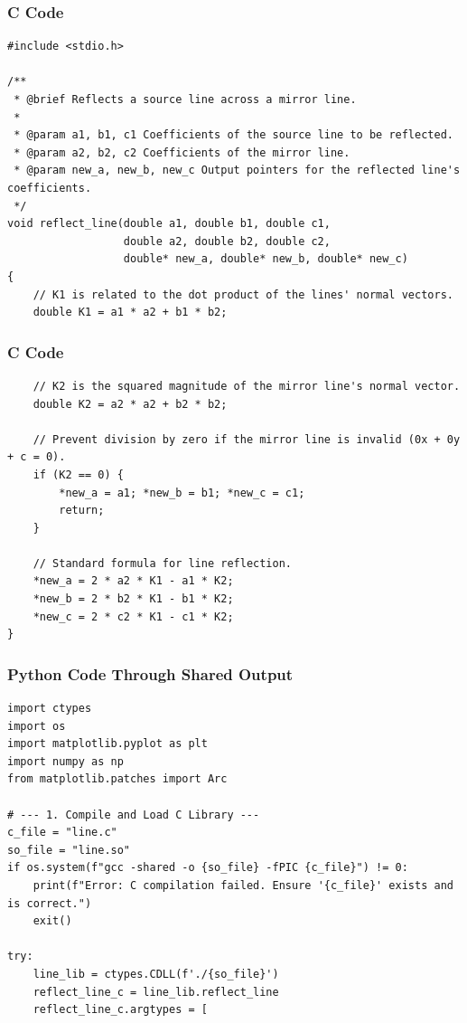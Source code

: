 \documentclass{beamer}
\begin{document}
\begin{frame}[fragile]
\frametitle{C Code}
\begin{lstlisting}
#include <stdio.h>

/**
 * @brief Reflects a source line across a mirror line.
 *
 * @param a1, b1, c1 Coefficients of the source line to be reflected.
 * @param a2, b2, c2 Coefficients of the mirror line.
 * @param new_a, new_b, new_c Output pointers for the reflected line's coefficients.
 */
void reflect_line(double a1, double b1, double c1,
                  double a2, double b2, double c2,
                  double* new_a, double* new_b, double* new_c)
{
    // K1 is related to the dot product of the lines' normal vectors.
    double K1 = a1 * a2 + b1 * b2;
\end{lstlisting}
\end{frame}
\begin{frame}[fragile]
\frametitle{C Code}
\begin{lstlisting}
    // K2 is the squared magnitude of the mirror line's normal vector.
    double K2 = a2 * a2 + b2 * b2;

    // Prevent division by zero if the mirror line is invalid (0x + 0y + c = 0).
    if (K2 == 0) {
        *new_a = a1; *new_b = b1; *new_c = c1;
        return;
    }
    
    // Standard formula for line reflection.
    *new_a = 2 * a2 * K1 - a1 * K2;
    *new_b = 2 * b2 * K1 - b1 * K2;
    *new_c = 2 * c2 * K1 - c1 * K2;
}
\end{lstlisting}
\end{frame}
\begin{frame}[fragile]
\frametitle{Python Code Through Shared Output}
\begin{lstlisting}
import ctypes
import os
import matplotlib.pyplot as plt
import numpy as np
from matplotlib.patches import Arc

# --- 1. Compile and Load C Library ---
c_file = "line.c"
so_file = "line.so"
if os.system(f"gcc -shared -o {so_file} -fPIC {c_file}") != 0:
    print(f"Error: C compilation failed. Ensure '{c_file}' exists and is correct.")
    exit()

try:
    line_lib = ctypes.CDLL(f'./{so_file}')
    reflect_line_c = line_lib.reflect_line
    reflect_line_c.argtypes = [
    \end{lstlisting}
\end{frame}
\end{document}
